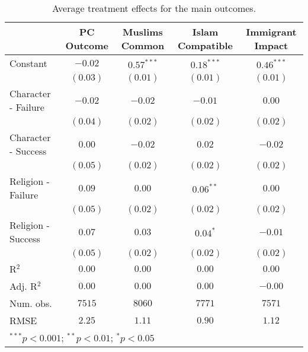 
\begin{table}[H]
\begin{center}
\begin{footnotesize}
\begin{tabular}{l c c c c}
\hline
 & PC Outcome & Muslims Common & Islam Compatible & Immigrant Impact \\
\hline
Constant            & $-0.02$  & $0.57^{***}$ & $0.18^{***}$ & $0.46^{***}$ \\
                    & $(0.03)$ & $(0.01)$     & $(0.01)$     & $(0.01)$     \\
Character - Failure & $-0.02$  & $-0.02$      & $-0.01$      & $0.00$       \\
                    & $(0.04)$ & $(0.02)$     & $(0.02)$     & $(0.02)$     \\
Character - Success & $0.00$   & $-0.02$      & $0.02$       & $-0.02$      \\
                    & $(0.05)$ & $(0.02)$     & $(0.02)$     & $(0.02)$     \\
Religion - Failure  & $0.09$   & $0.00$       & $0.06^{**}$  & $0.00$       \\
                    & $(0.05)$ & $(0.02)$     & $(0.02)$     & $(0.02)$     \\
Religion - Success  & $0.07$   & $0.03$       & $0.04^{*}$   & $-0.01$      \\
                    & $(0.05)$ & $(0.02)$     & $(0.02)$     & $(0.02)$     \\
\hline
R$^2$               & $0.00$   & $0.00$       & $0.00$       & $0.00$       \\
Adj. R$^2$          & $0.00$   & $0.00$       & $0.00$       & $-0.00$      \\
Num. obs.           & $7515$   & $8060$       & $7771$       & $7571$       \\
RMSE                & $2.25$   & $1.11$       & $0.90$       & $1.12$       \\
\hline
\multicolumn{5}{l}{\tiny{$^{***}p<0.001$; $^{**}p<0.01$; $^{*}p<0.05$}}
\end{tabular}
\end{footnotesize}
\caption{Average treatment effects for the main outcomes.}
\label{tab:ate_main}
\end{center}
\end{table}
